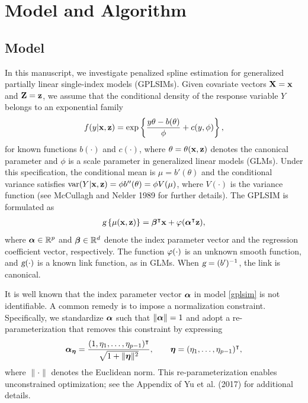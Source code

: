 \section{Model and Algorithm}
\subsection{Model}
In this manuscript, we investigate penalized spline estimation for generalized partially linear single-index models (GPLSIMs). Given covariate vectors $\mathbf{X}=\mathbf{x}$ and $\mathbf{Z}=\mathbf{z}$, we assume that the conditional density of the response variable $Y$ belongs to an exponential family
\begin{equation}
	f(y|\mathbf{x},\mathbf{z}) = \exp\left\{\frac{y\theta - b(\theta)}{\phi} + c(y,\phi)\right\}, \label{expfamily}
\end{equation}
for known functions $b(\cdot)$ and $c(\cdot)$, where $\theta=\theta(\mathbf{x},\mathbf{z})$ denotes the canonical parameter and $\phi$ is a scale parameter in generalized linear models (GLMs). Under this specification, the conditional mean is $\mu = b'(\theta)$ and the conditional variance satisfies $\text{var}(Y|\mathbf{x},\mathbf{z}) = \phi b''(\theta) = \phi V(\mu)$, 
where $V(\cdot)$ is the variance function (see McCullagh and Nelder 1989 for further details). The GPLSIM is formulated as
\begin{eqnarray}\label{gplsim}
	\textsl{g}\left\{\mu(\mathbf{x},\mathbf{z})\right\} = \bm\beta^\intercal\mathbf{x}+\varphi(\bm\alpha^\intercal\mathbf{z}),
\end{eqnarray}
where $\bm\alpha\in\mathbb{R}^p$ and $\bm\beta\in\mathbb{R}^d$ denote the index parameter vector and the regression coefficient vector, respectively. The function $\varphi(\cdot)$ is an unknown smooth function, and $\textsl{g}(\cdot)$ is a known link function, as in GLMs. When $\textsl{g} = (b')^{-1}$, the link is canonical. 

It is well known that the index parameter vector $\bm\alpha$ in model \eqref{gplsim} is not identifiable. A common remedy is to impose a normalization constraint. Specifically, we standardize $\bm\alpha$ such that $\|\bm\alpha\|=1$ and adopt a re-parameterization that removes this constraint by expressing
$$
\bm\alpha_{\bm\eta} = \frac{(1,\eta_1,\ldots,\eta_{p-1})^\intercal}{\sqrt{1+\|\bm\eta\|^2}},
\qquad
\bm\eta = (\eta_1,\ldots,\eta_{p-1})^\intercal,
$$
where $\|\cdot\|$ denotes the Euclidean norm. This re-parameterization enables unconstrained optimization; see the Appendix of Yu et al. (2017) for additional details. 

